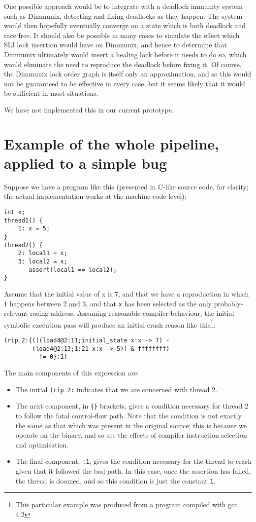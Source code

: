 \documentclass[10pt,a4paper,twocolumn]{article}
\begin{document}
One possible approach would be to integrate with a deadlock immunity
system such as Dimmunix\cite{Jula2008}, detecting and fixing deadlocks
as they happen.  The system would then hopefully eventually converge
on a state which is both deadlock and race free.  It should also be
possible in many cases to simulate the effect which SLI lock insertion
would have on Dimmunix, and hence to determine that Dimmunix
ultimately would insert a healing lock before it needs to do so, which
would eliminate the need to reproduce the deadlock before fixing it.
Of course, the Dimmunix lock order graph is itself only an
approximation, and so this would not be guaranteed to be effective in
every case, but it seems likely that it would be sufficient in most
situations.

We have not implemented this in our current prototype.

\section{Example of the whole pipeline, applied to a simple bug}

Suppose we have a program like this (presented in C-like source code,
for clarity; the actual implementation works at the machine code
level):

\begin{verbatim}
int x;
thread1() {
    1: x = 5;
}
thread2() {
    2: local1 = x;
    3: local2 = x;
       assert(local1 == local2);
}
\end{verbatim}

Assume that the initial value of x is 7, and that we have a
reproduction in which 1 happens between 2 and 3, and that \verb|x| has
been selected as the only probably-relevant racing address.  Assuming
reasonable compiler behaviour, the initial symbolic execution pass
will produce an initial crash reason like this\footnote{This
  particular example was produced from a program compiled with gcc
  4.2}:

\begin{verbatim}
(rip 2:{(((load4@2:11;initial_state x:x -> 7) -
        (load4@2:13;1:21 x:x -> 5)) & ffffffff)
          != 0}:1)
\end{verbatim}

The main components of this expression are:

\begin{itemize}
\item The initial \verb|(rip 2:| indicates that we are concerned with
  thread 2.
\item The next component, in \verb|{}| brackets, gives a condition
  necessary for thread 2 to follow the fatal control-flow path.  Note
  that the condition is not exactly the same as that which was present
  in the original source; this is because we operate on the binary,
  and so see the effects of compiler instruction selection and
  optimisation.
\item The final component, \verb|:1|, gives the condition necessary
  for the thread to crash given that it followed the bad path.  In
  this case, once the assertion has failed, the thread is doomed, and
  so this condition is just the constant \verb|1|.
\end{itemize}
\end{document}
